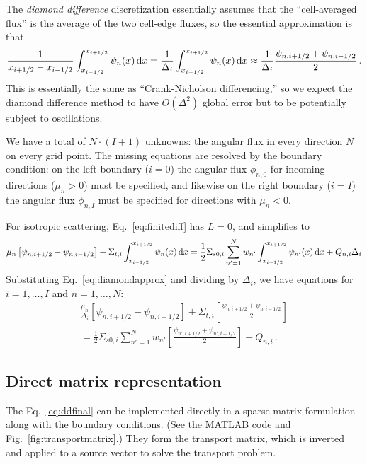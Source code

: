 \documentclass[]{SRJcommon}
\begin{document}
The \emph{diamond difference} discretization essentially assumes that the
``cell-averaged flux'' is the average of the two cell-edge fluxes, so the
essential approximation is that
\begin{equation}
  \frac{1}{x_{i+1/2} - x_{i-1/2}} \int_{x_{i-1/2}}^{x_{i+1/2}} \psi_{n}(x) \, \mathrm{d} x
 = \frac{1}{\Delta_i} \int_{x_{i-1/2}}^{x_{i+1/2}} \psi_{n}(x) \, \mathrm{d} x
\approx  \frac{1}{\Delta_i} \frac{\psi_{n,i+1/2} + \psi_{n,i-1/2}}{2} 
\,.
  \label{eq:diamondapprox}
\end{equation}
This is essentially the same as ``Crank-Nicholson differencing,'' so we expect
the diamond difference method to have $O(\Delta^2)$ global error but to be
potentially subject to oscillations.

We have a total of $N\cdot(I+1)$ unknowns: the angular flux in every
direction $N$ on every grid point. The missing equations are resolved by the
boundary condition: on the left boundary ($i=0$) the angular flux $\phi_{n,0}$
for incoming directions ($\mu_n > 0$) must be specified, and likewise on the
right boundary ($i=I$) the angular flux $\phi_{n,I}$ must be specified
for directions with $\mu_n < 0$.

For isotropic scattering, Eq.~\eqref{eq:finitediff} has $L=0$, and simplifies to
$$
 \mu_n \left[ \psi_{n,i+1/2} - \psi_{n,i-1/2} \right] + \Sigma_{t,i}
  \int_{x_{i-1/2}}^{x_{i+1/2}} \psi_n(x) \, \mathrm{d} x
= \frac{1}{2} \Sigma_{s0,i} 
 \sum_{n'=1}^{N} w_{n'}  \int_{x_{i-1/2}}^{x_{i+1/2}} \psi_{n'}(x) \, \mathrm{d} x
  + Q_{n,i}  \Delta_i
$$
Substituting Eq.~\eqref{eq:diamondapprox} and dividing by $\Delta_i$, we have equations for
$i=1,\ldots,I$ and $n=1,\ldots,N$:
\begin{multline}
  \frac{\mu_n}{\Delta_i}  \left[ \psi_{n,i+1/2} - \psi_{n,i-1/2} \right]
+ \Sigma_{t,i}  \left[ \frac{\psi_{n,i+1/2} + \psi_{n,i-1/2}}{2} \right]
\\
=
\frac{1}{2} \Sigma_{s0,i}
\sum_{n'=1}^{N} w_{n'} \left[ \frac{\psi_{n',i+1/2} + \psi_{n',i-1/2}}{2} \right]
  + Q_{n,i} \,.
  \label{eq:ddfinal}
\end{multline}

\subsection{Direct matrix representation}
The Eq.~\eqref{eq:ddfinal} can be implemented directly in a sparse matrix
formulation along with the boundary conditions. (See the MATLAB
code and Fig.~\ref{fig:transportmatrix}.)
They form the transport matrix, which is inverted and applied to a source
vector to solve the transport problem.
\end{document}
